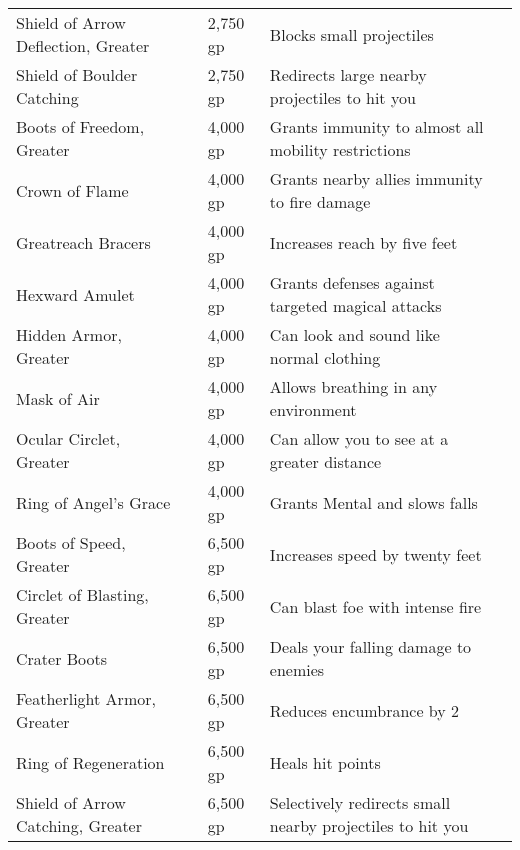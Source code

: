 \begin{longtabuwrapper}
\begin{longtabu}{l l l X l}
Shield of Arrow Deflection, Greater &  & 2,750 gp & Blocks small projectiles & \pageref{item:Shield of Arrow Deflection, Greater} \\
Shield of Boulder Catching &  & 2,750 gp & Redirects large nearby projectiles to hit you & \pageref{item:Shield of Boulder Catching} \\
Boots of Freedom, Greater &  & 4,000 gp & Grants immunity to almost all mobility restrictions & \pageref{item:Boots of Freedom, Greater} \\
Crown of Flame &  & 4,000 gp & Grants nearby allies immunity to fire damage & \pageref{item:Crown of Flame} \\
Greatreach Bracers &  & 4,000 gp & Increases reach by five feet & \pageref{item:Greatreach Bracers} \\
Hexward Amulet &  & 4,000 gp & Grants  defenses against targeted magical attacks & \pageref{item:Hexward Amulet} \\
Hidden Armor, Greater &  & 4,000 gp & Can look and sound like normal clothing & \pageref{item:Hidden Armor, Greater} \\
Mask of Air &  & 4,000 gp & Allows breathing in any environment & \pageref{item:Mask of Air} \\
Ocular Circlet, Greater &  & 4,000 gp & Can allow you to see at a greater distance & \pageref{item:Ocular Circlet, Greater} \\
Ring of Angel's Grace &  & 4,000 gp & Grants  Mental and slows falls & \pageref{item:Ring of Angel's Grace} \\
Boots of Speed, Greater &  & 6,500 gp & Increases speed by twenty feet & \pageref{item:Boots of Speed, Greater} \\
Circlet of Blasting, Greater &  & 6,500 gp & Can blast foe with intense fire & \pageref{item:Circlet of Blasting, Greater} \\
Crater Boots &  & 6,500 gp & Deals your falling damage to enemies & \pageref{item:Crater Boots} \\
Featherlight Armor, Greater &  & 6,500 gp & Reduces encumbrance by 2 & \pageref{item:Featherlight Armor, Greater} \\
Ring of Regeneration &  & 6,500 gp & Heals hit points & \pageref{item:Ring of Regeneration} \\
Shield of Arrow Catching, Greater &  & 6,500 gp & Selectively redirects small nearby projectiles to hit you & \pageref{item:Shield of Arrow Catching, Greater} \\

\end{longtabu}
\end{longtabuwrapper}
